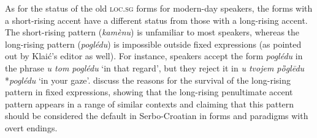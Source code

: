 \documentclass[output=paper,modfonts,nonflat
]{langsci/langscibook}
\begin{document}
As for the status of the old \textsc{loc}.\textsc{sg} forms for modern-day speakers, the forms with a short-rising accent have a different status from those with a long-rising accent. The short-rising pattern (\textit{kamènu}) is unfamiliar to most speakers, whereas the long-rising pattern (\textit{poglédu}) is impossible outside fixed expressions (as pointed out by Klaić's editor as well). For instance, speakers accept the form \textit{poglédu} in the phrase \textit{u tom poglédu} `in that regard', but they reject it in \textit{u tvojem pȍglēdu} *\textit{poglédu} `in your gaze'. \citet{SimonovicArsenijevic2015b} discuss the reasons for the survival of the long-rising pattern in fixed expressions, showing that the long-rising penultimate accent pattern appears in a range of similar contexts and claiming that this pattern should be considered the default in Serbo-Croatian in forms and paradigms with overt endings. 
\end{document}
